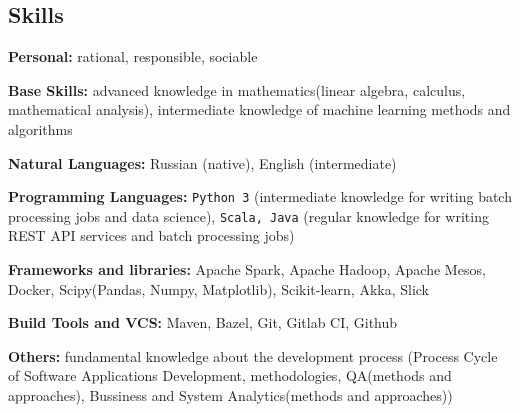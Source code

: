 \documentclass[12pt]{article}
\begin{document}
\subsection*{Skills}
\textbf{Personal:} rational, responsible, sociable

\textbf{Base Skills:} advanced knowledge in mathematics(linear algebra, calculus, mathematical analysis), intermediate knowledge of machine learning methods and algorithms

\textbf{Natural Languages:} Russian (native), English (intermediate)

\textbf{Programming Languages:} \texttt{Python 3} (intermediate knowledge for writing batch processing jobs and data science), \texttt{Scala, Java} (regular knowledge for writing REST API services and batch processing jobs)

\textbf{Frameworks and libraries:} Apache Spark, Apache Hadoop, Apache Mesos, Docker, Scipy(Pandas, Numpy, Matplotlib), Scikit-learn, Akka, Slick

\textbf{Build Tools and VCS:} Maven, Bazel, Git, Gitlab CI, Github

\textbf{Others:} fundamental knowledge about the development process (Process Cycle of Software Applications Development, methodologies, QA(methods and approaches), Bussiness and System Analytics(methods and approaches))
\end{document}
